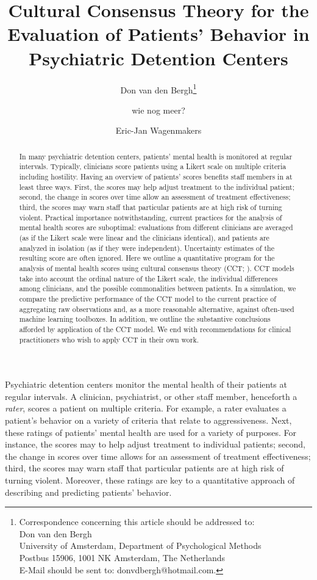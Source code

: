 \documentclass{article}
\title{Cultural Consensus Theory for the Evaluation of Patients’ Behavior in Psychiatric  Detention Centers}
\author[1]{Don van den Bergh\thanks{Correspondence concerning this article should be addressed to:  
\\  Don van den Bergh 
\\  University of Amsterdam, Department of Psychological Methods
\\  Postbus 15906, 1001 NK Amsterdam, The Netherlands
\\  E-Mail should be sent to: donvdbergh@hotmail.com.}}
\author[1]{wie nog meer?}
\author[1]{Eric-Jan Wagenmakers}
\affil[1]{University of Amsterdam}
\date{}
\begin{document}
\maketitle

\begin{abstract}
In many psychiatric detention centers, patients' mental health is monitored at regular intervals. Typically, clinicians score patients using a Likert scale on multiple criteria including hostility. Having an overview of patients’ scores benefits staff members in at least three ways. First, the scores may help adjust treatment to the individual patient; second, the change in scores over time allow an assessment of treatment effectiveness; third, the scores may warn staff that particular patients are at high risk of turning violent. Practical importance notwithstanding, current practices for the analysis of mental health scores are suboptimal: evaluations from different clinicians are averaged (as if the Likert scale were linear and the clinicians identical), and patients are analyzed in isolation (as if they were independent). Uncertainty estimates of the resulting score are often ignored. Here we outline a quantitative program for the analysis of mental health scores using cultural consensus theory (CCT; ). CCT models take into account the ordinal nature of the Likert scale, the individual differences among clinicians, and the possible commonalities between patients. In a simulation, we compare the predictive performance of the CCT model to the current practice of aggregating raw observations and, as a more reasonable alternative, against often-used machine learning toolboxes. In addition, we outline the substantive conclusions afforded by application of the CCT model. We end with recommendations for clinical practitioners who wish to apply CCT in their own work. 
\end{abstract}

\newpage


Psychiatric detention centers monitor the mental health of their patients at regular intervals. A clinician, psychiatrist, or other staff member, henceforth a \textit{rater}, scores a patient on multiple criteria. For example, a rater evaluates a patient's behavior on a variety of criteria that relate to aggressiveness. Next, these ratings of patients' mental health are used for a variety of purposes. For instance, the scores may to help adjust treatment to individual patients; second, the change in scores over time allows for an assessment of treatment effectiveness; third, the scores may warn staff that particular patients are at high risk of turning violent. Moreover, these ratings are key to a quantitative approach of describing and predicting patients' behavior.
\end{document}
